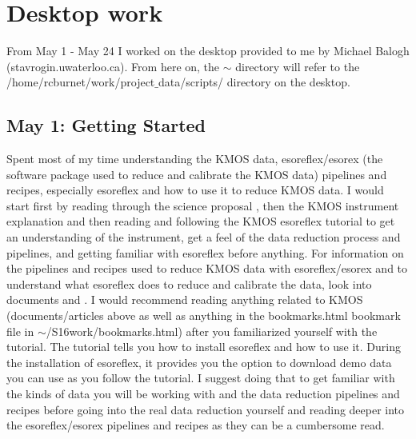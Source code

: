 \documentclass[10pt,letterpaper]{article}
\begin{document}
\section{Desktop work}
From May 1 - May 24 I worked on the desktop provided to me by Michael Balogh (stavrogin.uwaterloo.ca). From here on, the $\sim$ directory will refer to the /home/rcburnet/work/project$\_$data/scripts/ directory on the desktop.
\subsection{May 1: Getting Started}
Spent most of my time understanding the KMOS data, esoreflex/esorex (the software package used to reduce and calibrate the KMOS data) pipelines and recipes, especially esoreflex and how to use it to reduce KMOS data. I would start first by reading through the science proposal \cite{Proposal}, then the KMOS instrument explanation \cite{KMOS instrument explanation} and then reading and following the KMOS esoreflex tutorial \cite{KMOS esoreflex tutorial} to get an understanding of the instrument, get a feel of the data reduction process and pipelines, and getting familiar with esoreflex before anything. For information on the pipelines and recipes used to reduce KMOS data with esoreflex/esorex and to understand what esoreflex does to reduce and calibrate the data, look into documents \cite{KMOS pipeline manual} and \cite{KMOS pipeline cookbook}. I would recommend reading anything related to KMOS (documents/articles above as well as anything in the bookmarks.html bookmark file in $\sim$/S16work/bookmarks.html) after you familiarized yourself with the tutorial. The tutorial tells you how to install esoreflex and how to use it. During the installation of esoreflex, it provides you the option to download demo data you can use as you follow the tutorial. I suggest doing that to get familiar with the kinds of data you will be working with and the data reduction pipelines and recipes before going into the real data reduction yourself and reading deeper into the esoreflex/esorex pipelines and recipes as they can be a cumbersome read.\\
\end{document}
